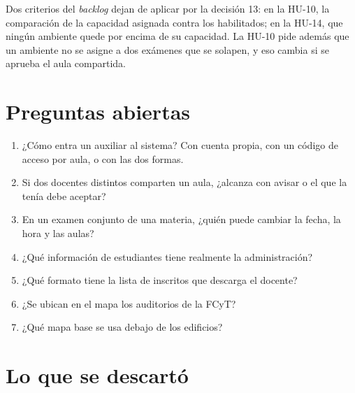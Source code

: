 \documentclass[11pt,letterpaper]{article}
\begin{document}
Dos criterios del \emph{backlog} dejan de aplicar por la decisión 13: en la HU-10, la
comparación de la capacidad asignada contra los habilitados; en la HU-14, que ningún
ambiente quede por encima de su capacidad. La HU-10 pide además que un ambiente no se
asigne a dos exámenes que se solapen, y eso cambia si se aprueba el aula compartida.

\section{Preguntas abiertas}

\begin{enumerate}
  \item ¿Cómo entra un auxiliar al sistema? Con cuenta propia, con un código de acceso
        por aula, o con las dos formas.
  \item Si dos docentes distintos comparten un aula, ¿alcanza con avisar o el que la
        tenía debe aceptar?
  \item En un examen conjunto de una materia, ¿quién puede cambiar la fecha, la hora y
        las aulas?
  \item ¿Qué información de estudiantes tiene realmente la administración?
  \item ¿Qué formato tiene la lista de inscritos que descarga el docente?
  \item ¿Se ubican en el mapa los auditorios de la FCyT?
  \item ¿Qué mapa base se usa debajo de los edificios?
\end{enumerate}

\section{Lo que se descartó}
\end{document}
